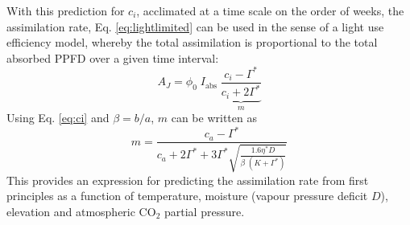 \documentclass{myreport}
\begin{document}
With this prediction for $c_i$, acclimated at a time scale on the order of weeks, the assimilation rate, Eq. \ref{eq:lightlimited} can be used in the sense of a light use efficiency model, whereby the total assimilation is proportional to the total absorbed PPFD over a given time interval:
\begin{equation}
\label{eq:lue}
        A_J = \phi_0 \; I_{\mathrm{abs}}\;\underbrace{\frac{c_i - \Gamma^{\ast}}{c_i + 2\Gamma^{\ast}}}_{m}
\end{equation}
Using Eq. \ref{eq:ci} and $\beta=b/a$, $m$ can be written as
\begin{equation}
    m = \frac{c_a - \Gamma^{\ast}}{c_a + 2 \Gamma^{\ast} + 3 \Gamma^{\ast} \sqrt{\frac{1.6 \eta^{\ast} D }{\beta\;(K+\Gamma^{\ast})}}}
\end{equation}
This provides an expression for predicting the assimilation rate from first principles as a function of temperature, moisture (vapour pressure deficit $D$), elevation and atmospheric CO$_2$ partial pressure.
\end{document}
